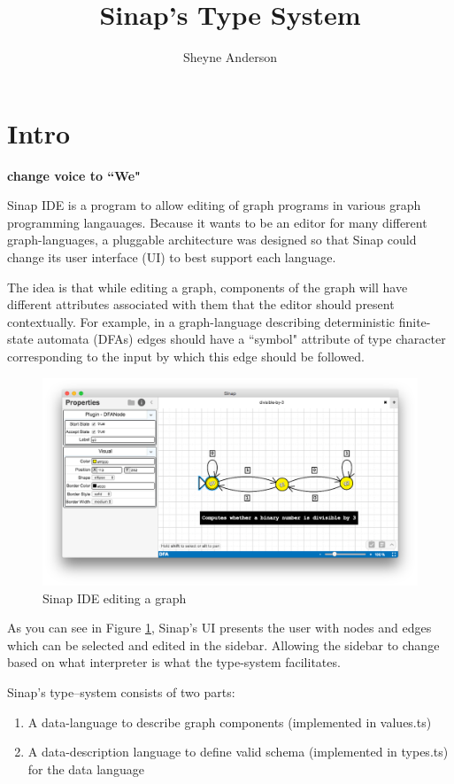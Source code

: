 \documentclass{article}
\begin{document}
\title{Sinap's Type System}
\author{Sheyne Anderson}
\maketitle
\section{Intro}

\textbf{change voice to ``We"}

Sinap IDE is a program to allow editing of graph
programs in various graph programming langauages. 
Because it wants to be an editor for many different
graph-languages, a pluggable architecture was designed
so that Sinap could change its user interface (UI)
to best support each language. 

The idea is that while editing a graph, components of the
graph will have different attributes associated with them 
that the editor should present contextually. For example, in
a graph-language describing deterministic finite-state 
automata (DFAs) edges should have a ``symbol" attribute of 
type character corresponding to the input by which this 
edge should be followed. 

\begin{figure}[h]
    \label{sinap-screenshot}  
    \centering
    \includegraphics[width=.8\textwidth]{sinap-screenshot}
    \caption{Sinap IDE editing a graph}
\end{figure}

As you can see in Figure \ref{sinap-screenshot}, Sinap's UI
presents the user with nodes and edges which can be selected 
and edited in the sidebar. Allowing the sidebar to change based
on what interpreter is what the type-system facilitates. 
    
Sinap's type–system consists of two parts:

\begin{enumerate}
    \item A data-language to describe graph components 
    (implemented in values.ts)
    \item A data-description language to define valid schema 
    (implemented in types.ts)
    for the data language
\end{enumerate}
\end{document}
